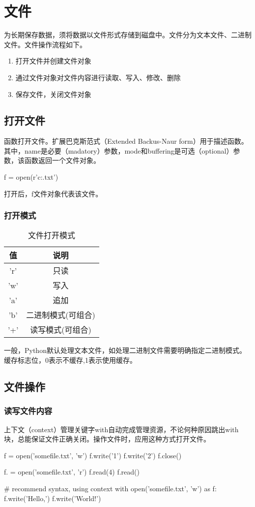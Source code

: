 \chapter{文件}
为长期保存数据，须将数据以文件形式存储到磁盘中。文件分为文本文件、二进制文件。文件操作流程如下。
\begin{enumerate}
\item 打开文件并创建文件对象
\item 通过文件对象对文件内容进行读取、写入、修改、删除
\item 保存文件，关闭文件对象
\end{enumerate}

\section{打开文件}
函数打开文件。扩展巴克斯范式（Extended Backus-Naur form）用于描述函数。其中，name是必要（madatory）参数，mode和buffering是可选（optional）参数，该函数返回一个文件对象。
\begin{python}
f = open(r'c:\text\somefile.txt')
\end{python}
打开后，f文件对象代表该文件。
\subsection{打开模式}
\begin{table}
\centering
\begin{tabular}{cc}
  \toprule
  值  & 说明 \\
  \midrule
  'r' & 只读 \\
  'w' & 写入 \\
  'a' & 追加 \\
  'b' & 二进制模式(可组合) \\
  '+' & 读写模式(可组合) \\
  \bottomrule
\end{tabular}
\caption{文件打开模式}
\end{table}
一般，Python默认处理文本文件，如处理二进制文件需要明确指定二进制模式。缓存标志位，0表示不缓存,1表示使用缓存。
\section{文件操作}
\subsection{读写文件内容}
上下文（context）管理关键字with自动完成管理资源，不论何种原因跳出with块，总能保证文件正确关闭。操作文件时，应用这种方式打开文件。
\begin{python}
f = open('somefile.txt', 'w')
f.write('1')
f.write('2')
f.close()

f. = open('somefile.txt', 'r')
f.read(4)
f.read()

# recommend syntax, using context
with open('somefile.txt', 'w') as f:
    f.write('Hello,')
    f.write('World!')
    
\end{python}
